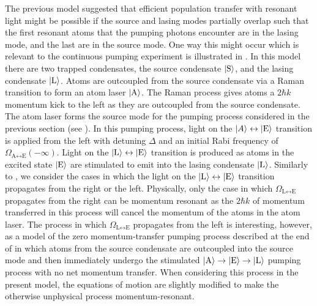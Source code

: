 The previous model suggested that efficient population transfer with resonant light might be possible if the source and lasing modes partially overlap such that the first resonant atoms that the pumping photons encounter are in the lasing mode, and the last are in the source mode.  One way this might occur which is relevant to the continuous pumping experiment is illustrated in .  In this model there are two trapped condensates, the source condensate ${\left|\text{S}\right>}$, and the lasing condensate ${\left|\text{L}\right>}$.  Atoms are outcoupled from the source condensate via a Raman transition to form an atom laser ${\left|\text{A}\right>}$.  The Raman process gives atoms a $2 \hbar k$ momentum kick to the left as they are outcoupled from the source condensate.  The atom laser forms the source mode for the pumping process considered in the previous section (see ).  In this pumping process, light on the ${\left|A\right>} \leftrightarrow {\ensuremath{\left|\text{E}\right>}}$ transition is applied from the left with detuning $\Delta$ and an initial Rabi frequency of $\Omega_{\text{A}\leftrightarrow\text{E}}(-\infty)$.  Light on the ${\left|\text{L}\right>} \leftrightarrow {\ensuremath{\left|\text{E}\right>}}$ transition is produced as atoms in the excited state ${\left|\text{E}\right>}$ are stimulated to emit into the lasing condensate ${\left|\text{L}\right>}$.  Similarly to , we consider the cases in which the light on the ${\left|\text{L}\right>} \leftrightarrow {\ensuremath{\left|\text{E}\right>}}$ transition propagates from the right or the left.  Physically, only the case in which $\Omega_{\text{L}\leftrightarrow\text{E}}$ propagates from the right can be momentum resonant as the $2 \hbar k$ of momentum transferred in this process will cancel the momentum of the atoms in the atom laser.  The process in which $\Omega_{\text{L}\leftrightarrow\text{E}}$ propagates from the left is interesting, however, as a model of the zero momentum-transfer pumping process described at the end of  in which atoms from the source condensate are outcoupled into the source mode and then immediately undergo the stimulated ${\left|\text{A}\right>} \rightarrow {\ensuremath{\left|\text{E}\right>}} \rightarrow {\ensuremath{\left|\text{L}\right>}}$ pumping process with no net momentum transfer.  When considering this process in the present model, the equations of motion are slightly modified to make the otherwise unphysical process momentum-resonant.

